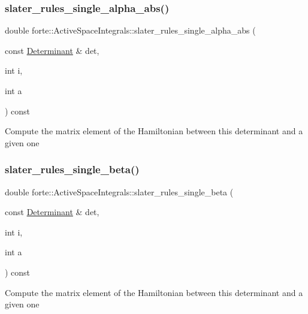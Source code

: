 \subsubsection{\texorpdfstring{slater\+\_\+rules\+\_\+single\+\_\+alpha\+\_\+abs()}{slater\_rules\_single\_alpha\_abs()}}
{\footnotesize\ttfamily double forte\+::\+Active\+Space\+Integrals\+::slater\+\_\+rules\+\_\+single\+\_\+alpha\+\_\+abs (\begin{DoxyParamCaption}\item[{const \mbox{\hyperlink{namespaceforte_a2076c63fd7b8732004d9e1442ce527c1}{Determinant}} \&}]{det,  }\item[{int}]{i,  }\item[{int}]{a }\end{DoxyParamCaption}) const}

Compute the matrix element of the Hamiltonian between this determinant and a given one \mbox{\label{classforte_1_1_active_space_integrals_a058234ffee116c7be071ebf33d319880}} 
\subsubsection{\texorpdfstring{slater\+\_\+rules\+\_\+single\+\_\+beta()}{slater\_rules\_single\_beta()}}
{\footnotesize\ttfamily double forte\+::\+Active\+Space\+Integrals\+::slater\+\_\+rules\+\_\+single\+\_\+beta (\begin{DoxyParamCaption}\item[{const \mbox{\hyperlink{namespaceforte_a2076c63fd7b8732004d9e1442ce527c1}{Determinant}} \&}]{det,  }\item[{int}]{i,  }\item[{int}]{a }\end{DoxyParamCaption}) const}

Compute the matrix element of the Hamiltonian between this determinant and a given one \mbox{\label{classforte_1_1_active_space_integrals_a1bb5b1702ef03d473ed13f97c56af37f}} 
